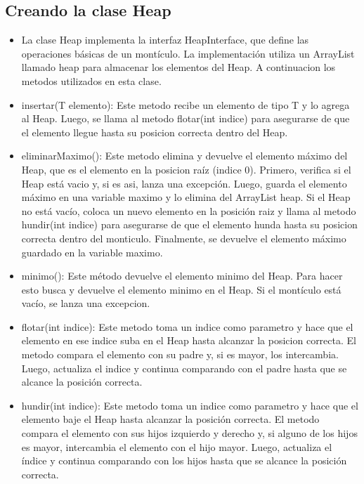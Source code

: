 \documentclass{article}
\begin{document}
	\subsection{Creando la clase Heap}
	\begin{itemize}
		\item La clase Heap implementa la interfaz HeapInterface, que define las operaciones básicas de un montículo. La implementación utiliza un ArrayList llamado heap para almacenar los elementos del Heap. A continuacion los metodos utilizados en esta clase.
		\item insertar(T elemento): Este metodo recibe un elemento de tipo T y lo agrega al Heap. Luego, se llama al metodo flotar(int indice) para asegurarse de que el elemento llegue hasta su posicion correcta dentro del Heap.
		\item eliminarMaximo(): Este metodo elimina y devuelve el elemento máximo del Heap, que es el elemento en la posicion raíz (indice 0). Primero, verifica si el Heap está vacio y, si es asi, lanza una excepción. Luego, guarda el elemento máximo en una variable maximo y lo elimina  del ArrayList heap. Si el Heap no está vacío, coloca un nuevo elemento en la posición raiz y llama al metodo hundir(int indice) para asegurarse de que el elemento hunda hasta su posicion correcta dentro del monticulo. Finalmente, se devuelve el elemento máximo guardado en la variable maximo.
		\item minimo(): Este método devuelve el elemento minimo del Heap. Para hacer esto busca y devuelve el elemento minimo en el Heap. Si el montículo está vacío, se lanza una excepcion.
		\item flotar(int indice): Este metodo toma un indice como parametro y hace que el elemento en ese indice suba en el Heap hasta alcanzar la posicion correcta. El metodo compara el elemento con su padre y, si es mayor, los intercambia. Luego, actualiza el indice y continua comparando con el padre hasta que se alcance la posición correcta.
		\item hundir(int indice): Este metodo toma un indice como parametro y hace que el elemento baje el Heap hasta alcanzar la posición correcta. El metodo compara el elemento con sus hijos izquierdo y derecho y, si alguno de los hijos es mayor, intercambia el elemento con el hijo mayor. Luego, actualiza el índice y continua comparando con los hijos hasta que se alcance la posición correcta.
	\end{itemize}

\end{document}
